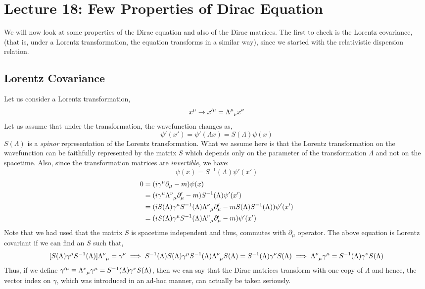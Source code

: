 \section*{Lecture 18: Few Properties of Dirac Equation}\label{sec:18}
We will now look at some properties of the Dirac equation and also of the Dirac matrices. The first to check is the Lorentz covariance, (that is, under a Lorentz transformation, the equation transforms in a similar way), since we started with the relativistic dispersion relation. 
\subsection{Lorentz Covariance}
Let us consider a Lorentz transformation,
$$x^\mu \rightarrow x'^\mu = \trmat{\mu}{\nu}x^\nu$$
Let us assume that under the transformation, the wavefunction changes as,
$$\psi'(x') = \psi'(\Lambda x) = S(\Lambda)\psi(x)$$
$S(\Lambda)$ is a \textit{spinor} representation of the Lorentz transformation. What we assume here is that the Lorentz transformation on the wavefunction can be faithfully represented by the matrix $S$ which depends only on the parameter of the transformation $\Lambda$ and not on the spacetime. Also, since the transformation matrices are \textit{invertible}, we have:
$$\psi(x) = S^{-1}(\Lambda)\psi'(x')$$
\begin{align*}
    0&= (i\gamma^\mu \partial_\mu - m)\psi(x)\\
    &= (i\gamma^\mu \trmat{\nu}{\mu}\partial'_\mu - m) S^{-1}(\Lambda)\psi'(x')\\
    &=(iS(\Lambda)\gamma^\mu  S^{-1}(\Lambda) \trmat{\nu}{\mu}\partial'_\mu  - mS(\Lambda)S^{-1}(\Lambda))\psi'(x')\\
    &=(iS(\Lambda)\gamma^\mu S^{-1}(\Lambda)  \trmat{\nu}{\mu}\partial'_\mu- m)\psi'(x')
\end{align*}
Note that we had used that the matrix $S$ is spacetime independent and thus, commutes with $\partial_\mu$ operator. The above equation is Lorentz covariant if we can find an $S$ such that,
\begin{equation}\label{eqn:gamtrans}
    [S(\Lambda)\gamma^\mu S^{-1}(\Lambda)]  \trmat{\nu}{\mu} = \gamma^\nu \implies S^{-1}(\Lambda)S(\Lambda)\gamma^\mu S^{-1}(\Lambda)  \trmat{\nu}{\mu}S(\Lambda) = S^{-1}(\Lambda)\gamma^\nu S(\Lambda)\implies \trmat{\nu}{\mu}\gamma^\mu = S^{-1}(\Lambda)\gamma^\nu S(\Lambda)
\end{equation}
Thus, if we define $\gamma'^\mu \equiv \trmat{\nu}{\mu}\gamma^\mu = S^{-1}(\Lambda)\gamma^\nu S(\Lambda)$, then we can say that the Dirac matrices transform with one copy of $\Lambda$ and hence, the vector index on $\gamma$, which was introduced in an ad-hoc manner, can actually be taken seriously. 
